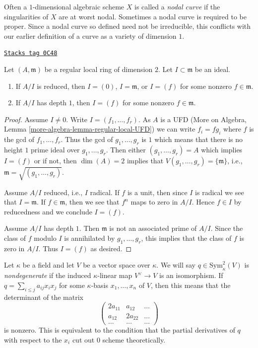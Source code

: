 Often a $1$-dimensional algebraic scheme $X$ is called a {\it nodal curve}
if the singularities of $X$ are at worst nodal. Sometimes a nodal curve
is required to be proper. Since a nodal curve
so defined need not be irreducible, this conflicts with our earlier definition
of a curve as a variety of dimension $1$.

\begin{lemma}
\label{curves-lemma-reduced-quotient-regular-ring-dim-2}
\href{https://stacks.math.columbia.edu/tag/0C48}{\texttt{Stacks tag 0C48}}

Let $(A, \mathfrak m)$ be a regular local ring of dimension $2$.
Let $I \subset \mathfrak m$ be an ideal.
\begin{enumerate}
\item If $A/I$ is reduced, then $I = (0)$, $I = \mathfrak m$, or
$I = (f)$ for some nonzero $f \in \mathfrak m$.
\item If $A/I$ has depth $1$, then $I = (f)$ for some nonzero
$f \in \mathfrak m$.
\end{enumerate}
\end{lemma}

\begin{proof}
Assume $I \not = 0$. Write $I = (f_1, \ldots, f_r)$. As $A$ is a UFD
(More on Algebra, Lemma \ref{more-algebra-lemma-regular-local-UFD})
we can write $f_i = fg_i$ where $f$ is the gcd of $f_1, \ldots, f_r$.
Thus the gcd of $g_1, \ldots, g_r$ is $1$ which means that
there is no height $1$ prime ideal over $g_1, \ldots, g_r$.
Then either $(g_1, \ldots, g_r) = A$ which implies $I = (f)$ or
if not, then $\dim(A) = 2$ implies that
$V(g_1, \ldots, g_r) = \{\mathfrak m\}$, i.e.,
$\mathfrak m = \sqrt{(g_1, \ldots, g_r)}$.

\medskip\noindent
Assume $A/I$ reduced, i.e., $I$ radical. If $f$ is a unit, then since $I$
is radical we see that $I = \mathfrak m$. If $f \in \mathfrak m$, then we
see that $f^n$ maps to zero in $A/I$. Hence $f \in I$ by reducedness and
we conclude $I = (f)$.

\medskip\noindent
Assume $A/I$ has depth $1$. Then $\mathfrak m$ is not an associated
prime of $A/I$. Since the class of $f$ modulo $I$ is annihilated
by $g_1, \ldots, g_r$, this implies that the class of $f$ is zero
in $A/I$. Thus $I = (f)$ as desired.
\end{proof}

Let $\kappa$ be a field and let $V$ be a vector space over $\kappa$.
We will say $q \in \text{Sym}^2_\kappa(V)$ is {\it nondegenerate}
if the induced $\kappa$-linear map $V^\vee \to V$ is an
isomorphism. If $q = \sum_{i \leq j} a_{ij} x_i x_j$ for some
$\kappa$-basis $x_1, \ldots, x_n$ of $V$, then this means that
the determinant of the matrix
$$
\left(
\begin{matrix}
2a_{11} & a_{12} & \ldots \\
a_{12} & 2a_{22} & \ldots \\
\ldots & \ldots & \ldots
\end{matrix}
\right)
$$
is nonzero. This is equivalent to the condition that the
partial derivatives of $q$ with respect to the $x_i$ cut out
$0$ scheme theoretically.


